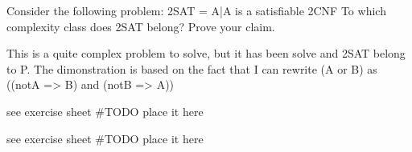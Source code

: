 \begin{ex}[\kSAT{2}]
	Consider the following problem:
	2SAT = {A|A is a satisfiable 2CNF}
	To which complexity class does 2SAT belong? Prove your claim.
\end{ex}
\begin{solution}
	This is a quite complex problem to solve, but it has been solve and 2SAT belong to P. The dimonstration is based on the fact that I can rewrite (A or B) as ((notA => B) and (notB => A))
\end{solution}

\begin{ex}[\NODECOVER]
	see exercise sheet \#TODO place it here
\end{ex}
\begin{ex}
	see exercise sheet \#TODO place it here
\end{ex}



